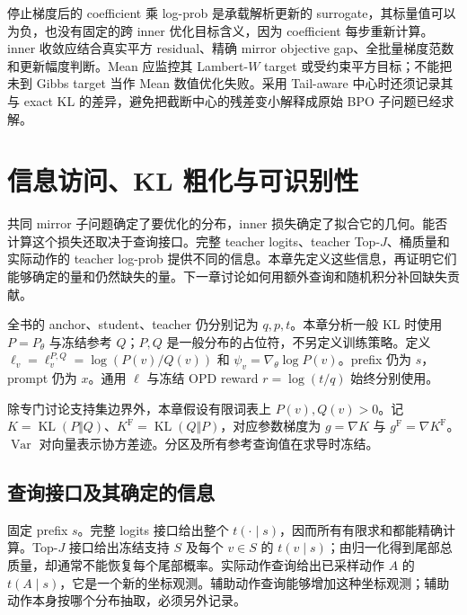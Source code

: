 \documentclass[lang=cn,scheme=chinese,openany]{../book/elegantbook}
\newcommand{\KL}{\operatorname{KL}}
\newcommand{\Var}{\operatorname{Var}}
\begin{document}
停止梯度后的 coefficient 乘 log-prob 是承载解析更新的 surrogate，其标量值可以为负，也没有固定的跨 inner 优化目标含义，因为 coefficient 每步重新计算。inner 收敛应结合真实平方 residual、精确 mirror objective gap、全批量梯度范数和更新幅度判断。Mean 应监控其 Lambert-$W$ target 或受约束平方目标；不能把未到 Gibbs target 当作 Mean 数值优化失败。采用 Tail-aware 中心时还须记录其与 exact KL 的差异，避免把截断中心的残差变小解释成原始 BPO 子问题已经求解。





\chapter{信息访问、KL 粗化与可识别性}
\label{inf:chapter}

共同 mirror 子问题确定了要优化的分布，inner 损失确定了拟合它的几何。能否计算这个损失还取决于查询接口。完整 teacher logits、teacher Top-$J$、桶质量和实际动作的 teacher log-prob 提供不同的信息。本章先定义这些信息，再证明它们能够确定的量和仍然缺失的量。下一章讨论如何用额外查询和随机积分补回缺失贡献。

全书的 anchor、student、teacher 仍分别记为 $q,p,t$。本章分析一般 KL 时使用 $P=P_\theta$ 与冻结参考 $Q$；$P,Q$ 是一般分布的占位符，不另定义训练策略。定义 $\ell_v=\ell_v^{P,Q}=\log(P(v)/Q(v))$ 和 $\psi_v=\nabla_\theta\log P(v)$。prefix 仍为 $s$，prompt 仍为 $x$。通用 $\ell$ 与冻结 OPD reward $r=\log(t/q)$ 始终分别使用。

除专门讨论支持集边界外，本章假设有限词表上 $P(v),Q(v)>0$。记 $K=\KL(P\Vert Q)$、$K^{\mathrm F}=\KL(Q\Vert P)$，对应参数梯度为 $g=\nabla K$ 与 $g^{\mathrm F}=\nabla K^{\mathrm F}$。$\Var$ 对向量表示协方差迹。分区及所有参考查询值在求导时冻结。


\section{查询接口及其确定的信息}
\label{inf:access}

固定 prefix $s$。完整 logits 接口给出整个 $t(\cdot\mid s)$，因而所有有限求和都能精确计算。Top-$J$ 接口给出冻结支持 $S$ 及每个 $v\in S$ 的 $t(v\mid s)$；由归一化得到尾部总质量，却通常不能恢复每个尾部概率。实际动作查询给出已采样动作 $A$ 的 $t(A\mid s)$，它是一个新的坐标观测。辅助动作查询能够增加这种坐标观测；辅助动作本身按哪个分布抽取，必须另外记录。
\end{document}
